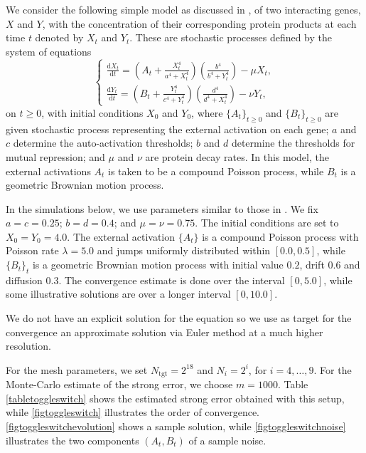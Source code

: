 \documentclass[reqno,12pt]{amsart}
\theoremstyle{plain} %
\theoremstyle{definition} %
\begin{document}
We consider the following simple model as discussed in \cite[Section 7.8]{Asai2016}, of two interacting genes, $X$ and $Y$, with the concentration of their corresponding protein products at each time $t$ denoted by $X_t$ and $Y_t$. These are stochastic processes defined by the system of equations
\begin{equation}
    \label{toggleswitchsystem}
   \begin{cases}
   \frac{\displaystyle \mathrm{d}X_t}{\displaystyle \mathrm{d} t} = \left( A_t + \frac{\displaystyle X_t^4}{\displaystyle a^4 + X_t^4}\right)\left(\frac{\displaystyle b^4}{\displaystyle b^4 + Y_t^4}\right) - \mu X_t, \\
   \frac{\displaystyle \mathrm{d}Y_t}{\displaystyle \mathrm{d} t} = \left( B_t + \frac{\displaystyle Y_t^4}{\displaystyle c^4 + Y_t^4}\right)\left(\frac{\displaystyle d^4}{\displaystyle d^4 + X_t^4}\right) - \nu Y_t,
   \end{cases}
\end{equation}
on $t \geq 0$, with initial conditions $X_0$ and $Y_0$, where $\{A_t\}_{t\geq 0}$ and $\{B_t\}_{t\geq 0}$ are given stochastic process representing the external activation on each gene; $a$ and $c$ determine the auto-activation thresholds; $b$ and $d$ determine the thresholds for mutual repression; and $\mu$ and $\nu$ are protein decay rates. In this model, the external activations $A_t$ is taken to be a compound Poisson process, while $B_t$ is a geometric Brownian motion process.

In the simulations below, we use parameters similar to those in \cite[Section 7.8]{Asai2016}. We fix $a = c = 0.25$; $b = d = 0.4$; and $\mu = \nu = 0.75$. The initial conditions are set to $X_0 = Y_0 = 4.0$. The external activation $\{A_t\}$ is a compound Poisson process with Poisson rate $\lambda = 5.0$ and jumps uniformly distributed within $[0.0, 0.5]$, while $\{B_t\}_t$ is a geometric Brownian motion process with initial value $0.2$, drift $0.6$ and diffusion $0.3$. The convergence estimate is done over the interval $[0, 5.0]$, while some illustrative solutions are over a longer interval $[0, 10.0]$.

We do not have an explicit solution for the equation so we use as target for the convergence an approximate solution via Euler method at a much higher resolution.

For the mesh parameters, we set $N_{\textrm{tgt}} = 2^{18}$ and $N_i = 2^i$, for $i=4, \ldots, 9$. For the Monte-Carlo estimate of the strong error, we choose $m=1000.$ Table \ref{tabletoggleswitch} shows the estimated strong error obtained with this setup, while \cref{figtoggleswitch} illustrates the order of convergence. \cref{figtoggleswitchevolution} shows a sample solution, while \cref{figtoggleswitchnoise} illustrates the two components $(A_t, B_t)$ of a sample noise.
\end{document}
